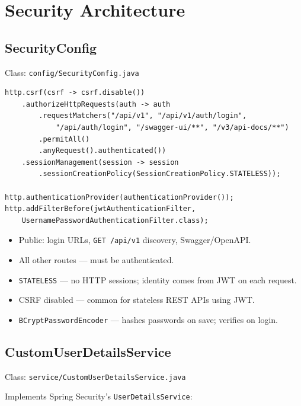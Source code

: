 \documentclass[11pt,a4paper]{article}
\begin{document}
\section{Security Architecture}

\subsection{SecurityConfig}

Class: \texttt{config/SecurityConfig.java}

\begin{lstlisting}[style=javacode, caption={Security filter chain (excerpt)}]
http.csrf(csrf -> csrf.disable())
    .authorizeHttpRequests(auth -> auth
        .requestMatchers("/api/v1", "/api/v1/auth/login",
            "/api/auth/login", "/swagger-ui/**", "/v3/api-docs/**")
        .permitAll()
        .anyRequest().authenticated())
    .sessionManagement(session -> session
        .sessionCreationPolicy(SessionCreationPolicy.STATELESS));

http.authenticationProvider(authenticationProvider());
http.addFilterBefore(jwtAuthenticationFilter,
    UsernamePasswordAuthenticationFilter.class);
\end{lstlisting}

\begin{itemize}[noitemsep]
    \item Public: login URLs, \texttt{GET /api/v1} discovery, Swagger/OpenAPI.
    \item All other routes --- must be authenticated.
    \item \texttt{STATELESS} --- no HTTP sessions; identity comes from JWT on each request.
    \item CSRF disabled --- common for stateless REST APIs using JWT.
    \item \texttt{BCryptPasswordEncoder} --- hashes passwords on save; verifies on login.
\end{itemize}

\subsection{CustomUserDetailsService}

Class: \texttt{service/CustomUserDetailsService.java}

Implements Spring Security's \texttt{UserDetailsService}:
\end{document}
